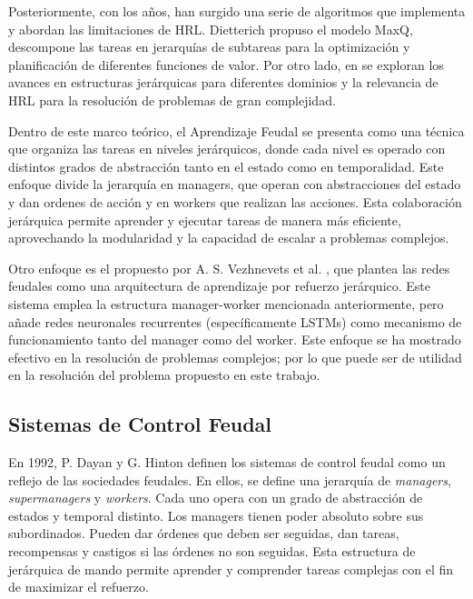 \documentclass[letterpaper]{article} %
\begin{document}
Posteriormente, con los años, han surgido una serie de algoritmos que implementa y abordan las limitaciones de HRL. 
Dietterich \cite{dietterich2000hierarchical} propuso el modelo MaxQ, descompone las tareas en jerarquías de subtareas
para la optimización y planificación de diferentes funciones de valor. Por otro lado, en \cite{barto2003recent} se exploran 
los avances en estructuras jerárquicas para diferentes dominios y la relevancia de HRL para la resolución de problemas de 
gran complejidad.  

Dentro de este marco teórico, el Aprendizaje Feudal se presenta como una técnica que organiza las tareas en niveles jerárquicos, donde cada nivel 
es operado con distintos grados de abstracción tanto en el estado como en temporalidad. Este enfoque \cite{dayan1992feudal} divide la jerarquía en managers, que operan con abstracciones 
del estado y dan ordenes de acción y en workers que realizan las acciones. Esta colaboración jerárquica permite aprender y ejecutar tareas de manera más eficiente, aprovechando
la modularidad y la capacidad de escalar a problemas complejos.

Otro enfoque es el propuesto por A. S. Vezhnevets et al. \cite{vezhnevets2017feudal}, que plantea las redes feudales como una arquitectura de aprendizaje por refuerzo jerárquico.
Este sistema emplea la estructura manager-worker mencionada anteriormente, pero añade redes neuronales recurrentes (específicamente LSTMs) como mecanismo de funcionamiento tanto del 
manager como del worker. Este enfoque se ha mostrado efectivo en la resolución de problemas complejos; por lo que puede ser de utilidad en la resolución del problema propuesto en este trabajo.

\subsection{Sistemas de Control Feudal}
En 1992, P. Dayan y G. Hinton \cite{dayan1992feudal} definen los sistemas de control feudal como un reflejo de las sociedades feudales. En ellos, se 
define una jerarquía de \textit{managers}, \textit{supermanagers} y \textit{workers}. Cada uno opera con un grado de abstracción de estados y temporal
distinto. Los managers tienen poder absoluto sobre sus subordinados. Pueden dar órdenes que deben ser seguidas, dan tareas, recompensas y castigos si 
las órdenes no son seguidas. Esta estructura de jerárquica de mando permite aprender y comprender tareas complejas con el fin de maximizar el refuerzo.
\end{document}

